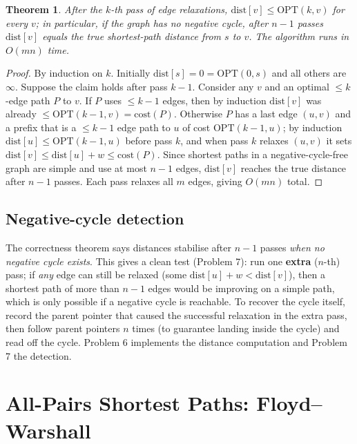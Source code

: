 \documentclass[11pt]{article}
\newtheorem{theorem}{Theorem}[section]
\begin{document}
\begin{theorem}
After the $k$-th pass of edge relaxations, $\mathrm{dist}[v] \le \mathrm{OPT}(k,v)$ for
every $v$; in particular, if the graph has no negative cycle, after $n-1$ passes
$\mathrm{dist}[v]$ equals the true shortest-path distance from $s$ to $v$. The algorithm
runs in $O(mn)$ time.
\end{theorem}
\begin{proof}
By induction on $k$. Initially $\mathrm{dist}[s]=0=\mathrm{OPT}(0,s)$ and all others are
$\infty$. Suppose the claim holds after pass $k-1$. Consider any $v$ and an optimal
$\le k$-edge path $P$ to $v$. If $P$ uses $\le k-1$ edges, then by induction
$\mathrm{dist}[v]$ was already $\le \mathrm{OPT}(k-1,v) = \mathrm{cost}(P)$. Otherwise $P$
has a last edge $(u,v)$ and a prefix that is a $\le k-1$ edge path to $u$ of cost
$\mathrm{OPT}(k-1,u)$; by induction $\mathrm{dist}[u] \le \mathrm{OPT}(k-1,u)$ before pass
$k$, and when pass $k$ relaxes $(u,v)$ it sets $\mathrm{dist}[v] \le \mathrm{dist}[u] + w
\le \mathrm{cost}(P)$. Since shortest paths in a negative-cycle-free graph are simple and
use at most $n-1$ edges, $\mathrm{dist}[v]$ reaches the true distance after $n-1$ passes.
Each pass relaxes all $m$ edges, giving $O(mn)$ total.
\end{proof}

\subsection{Negative-cycle detection}

The correctness theorem says distances stabilise after $n-1$ passes \emph{when no negative
cycle exists}. This gives a clean test (Problem 7): run one \textbf{extra} ($n$-th) pass; if
\emph{any} edge can still be relaxed (some $\mathrm{dist}[u] + w < \mathrm{dist}[v]$), then a
shortest path of more than $n-1$ edges would be improving on a simple path, which is only
possible if a negative cycle is reachable. To recover the cycle itself, record the parent
pointer that caused the successful relaxation in the extra pass, then follow parent pointers
$n$ times (to guarantee landing inside the cycle) and read off the cycle. Problem 6
implements the distance computation and Problem 7 the detection.

\section{All-Pairs Shortest Paths: Floyd--Warshall}
\end{document}
